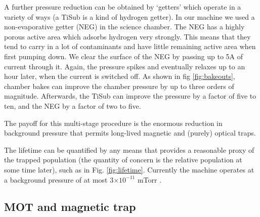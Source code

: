 
		A further pressure reduction can be obtained by `getters' which operate in a variety of ways (a TiSub is a kind of hydrogen getter).
		In our machine we used a non-evaporative getter (NEG) in the science chamber.
		The NEG has a highly porous active area which adsorbs hydrogen very strongly.
		This means that they tend to carry in a lot of contaminants and have little remaining active area when first pumping down.
		We clear the surface of the NEG by passing up to 5A of current through it.
	Again, the pressure spikes and eventually relaxes up to an hour later, when the current is switched off.
		As shown in fig \ref{fig:bakeouts}, chamber bakes can improve the chamber pressure by up to three orders of magnitude.
	Afterwards, the TiSub can improve the pressure by a factor of five to ten, and the NEG by a factor of two to five.
		
		
		The payoff for this multi-stage procedure is the enormous reduction in background pressure that permits long-lived magnetic and (purely) optical traps.
	
		The lifetime can be quantified by any means that provides a reasonable proxy of the trapped population (the quantity of concern is the relative population at some time later), such as in Fig.	\ref{fig:lifetime}.
		Currently the machine operates at a background pressure of at most 3$\times10^{-11}$ mTorr \cite{Abbas21}.
	






\subsection{MOT and magnetic trap}
\label{sec:new_optics}

